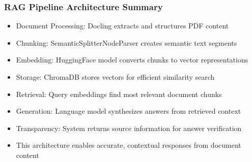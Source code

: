 \begin{frame}[fragile]\frametitle{RAG Pipeline Architecture Summary}
      \begin{itemize}
          \item Document Processing: Docling extracts and structures PDF content
          \item Chunking: SemanticSplitterNodeParser creates semantic text segments
          \item Embedding: HuggingFace model converts chunks to vector representations
          \item Storage: ChromaDB stores vectors for efficient similarity search
          \item Retrieval: Query embeddings find most relevant document chunks
          \item Generation: Language model synthesizes answers from retrieved context
          \item Transparency: System returns source information for answer verification
          \item This architecture enables accurate, contextual responses from document content
      \end{itemize}
\end{frame}